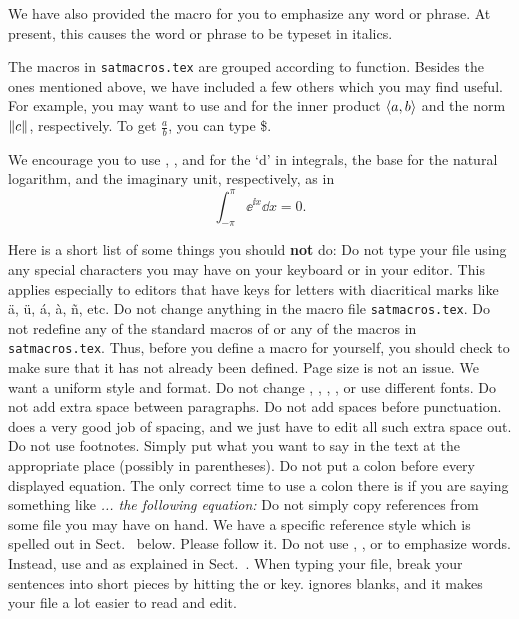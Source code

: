 We have also provided the macro  for you to emphasize any word or
phrase. At present, this causes the word or phrase to be typeset in italics.

The macros in {\tt satmacros.tex} are grouped according to function.
Besides the ones mentioned above, we have included a few others
which you may find useful.  For example, you may want to use
 and  for the inner product
$\langle a,b\rangle$ and the norm $\Vert c\Vert$, respectively.
To get $\frac{a}{b}$,
you can type \$.

We encourage you to use , , and  for the `d' in
integrals, the base for the natural logarithm, and the imaginary unit,
respectively, as in
$$\int_{-\pi}^\pi \ee^{\ii x}\dd x = 0.$$

Here is a short list of some things you should {\bf not} do:
\medskip
\bull Do not type your \Tex file using any special characters
you may have on your keyboard or in your editor.  This applies
especially to editors that have keys for letters with diacritical
marks like \"a, \"u, \'a, \`a, \~n, etc.
\smallskip
\bull Do not change anything in the macro file {\tt satmacros.tex}.
\smallskip
\bull Do not redefine any of the standard macros of \Tex
or any of the macros in {\tt satmacros.tex}.
Thus, before you define a macro for yourself, you should
check to make sure that it has not already been defined.
\smallskip
\bull Page size is not an issue. We want a uniform style and format. Do not
change , , , ,
or use different fonts.
\smallskip
\bull Do not add extra space between paragraphs.
\smallskip
\bull Do not add spaces before punctuation.  \Tex does a very
  good job of spacing, and we just have to edit all such extra
  space out.
\smallskip
\bull Do not use footnotes.  Simply put what you want to say in
  the text at the appropriate place (possibly in parentheses).
\smallskip
\bull Do not put a colon before every displayed equation.  The
  only correct time to use a colon there is if you are saying
  something like {\sl ... the following equation:}
\smallskip
\bull Do not simply copy references from some file you may have
  on hand.  We have a specific reference style which is spelled
  out in Sect.~ below. Please follow it.
\smallskip
\bull Do not use , , or  to emphasize words.
Instead, use  and  as explained in
Sect.~.
\smallskip
\bull When typing your \Tex file, break your sentences into
short pieces by hitting the  or
 key. \Tex ignores blanks, and
it makes your file a lot easier to read and edit.

